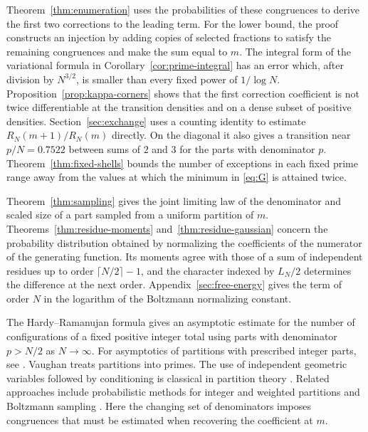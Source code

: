 \documentclass[11pt]{amsart}
\theoremstyle{remark}
\begin{document}
Theorem~\ref{thm:enumeration} uses the probabilities of these congruences to derive the first two corrections to the leading term. For the lower bound, the proof constructs an injection by adding copies of selected fractions to satisfy the remaining congruences and make the sum equal to \(m\). The integral form of the variational formula in Corollary~\ref{cor:prime-integral} has an error which, after division by \(N^{3/2}\), is smaller than every fixed power of \(1/\log N\). Proposition~\ref{prop:kappa-corners} shows that the first correction coefficient is not twice differentiable at the transition densities and on a dense subset of positive densities. Section~\ref{sec:exchange} uses a counting identity to estimate \(R_N(m+1)/R_N(m)\) directly. On the diagonal it also gives a transition near \(p/N=0.7522\) between sums of \(2\) and \(3\) for the parts with denominator \(p\). Theorem~\ref{thm:fixed-shells} bounds the number of exceptions in each fixed prime range away from the values at which the minimum in \eqref{eq:G} is attained twice.

Theorem~\ref{thm:sampling} gives the joint limiting law of the denominator and scaled size of a part sampled from a uniform partition of \(m\). Theorems~\ref{thm:residue-moments} and~\ref{thm:residue-gaussian} concern the probability distribution obtained by normalizing the coefficients of the numerator of the generating function. Its moments agree with those of a sum of independent residues up to order \(\lceil N/2\rceil-1\), and the character indexed by \(L_N/2\) determines the difference at the next order. Appendix~\ref{sec:free-energy} gives the term of order \(N\) in the logarithm of the Boltzmann normalizing constant.

The Hardy--Ramanujan formula \cite{hardy-ramanujan} gives an asymptotic estimate for the number of configurations of a fixed positive integer total using parts with denominator \(p>N/2\) as \(N\to\infty\). For asymptotics of partitions with prescribed integer parts, see \cite{ingham-tauberian,meinardus,roth-szekeres}. Vaughan \cite{vaughan} treats partitions into primes. The use of independent geometric variables followed by conditioning is classical in partition theory \cite{fristedt}. Related approaches include probabilistic methods for integer and weighted partitions \cite{erdos-lehner,granovsky-stark-erlihson,vershik} and Boltzmann sampling \cite{duchon-et-al}. Here the changing set of denominators imposes congruences that must be estimated when recovering the coefficient at \(m\).
\end{document}
